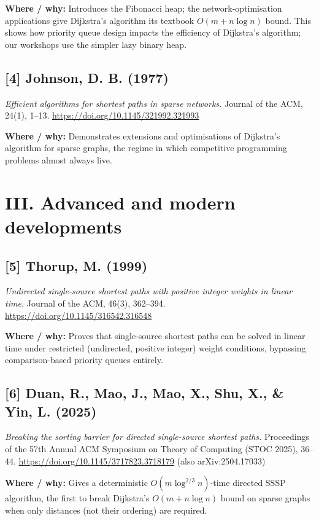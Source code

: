 \documentclass[11pt]{article}
\begin{document}
\textbf{Where / why:} Introduces the Fibonacci heap; the network-optimisation applications give Dijkstra's algorithm its textbook $O(m+n\log n)$ bound. This shows how priority queue design impacts the efficiency of Dijkstra's algorithm; our workshops use the simpler lazy binary heap.

\subsection*{[4] Johnson, D. B. (1977)}
\textit{Efficient algorithms for shortest paths in sparse networks.}
Journal of the ACM, 24(1), 1--13.
\url{https://doi.org/10.1145/321992.321993}

\textbf{Where / why:} Demonstrates extensions and optimisations of Dijkstra's algorithm for sparse graphs, the regime in which competitive programming problems almost always live.

\section*{III. Advanced and modern developments}

\subsection*{[5] Thorup, M. (1999)}
\textit{Undirected single-source shortest paths with positive integer weights in linear time.}
Journal of the ACM, 46(3), 362--394.
\url{https://doi.org/10.1145/316542.316548}

\textbf{Where / why:} Proves that single-source shortest paths can be solved in linear time under restricted (undirected, positive integer) weight conditions, bypassing comparison-based priority queues entirely.

\subsection*{[6] Duan, R., Mao, J., Mao, X., Shu, X., \& Yin, L. (2025)}
\textit{Breaking the sorting barrier for directed single-source shortest paths.}
Proceedings of the 57th Annual ACM Symposium on Theory of Computing (STOC 2025), 36--44.
\url{https://doi.org/10.1145/3717823.3718179} (also arXiv:2504.17033)

\textbf{Where / why:} Gives a deterministic $O(m\log^{2/3} n)$-time directed SSSP algorithm, the first to break Dijkstra's $O(m+n\log n)$ bound on sparse graphs when only distances (not their ordering) are required.
\end{document}
